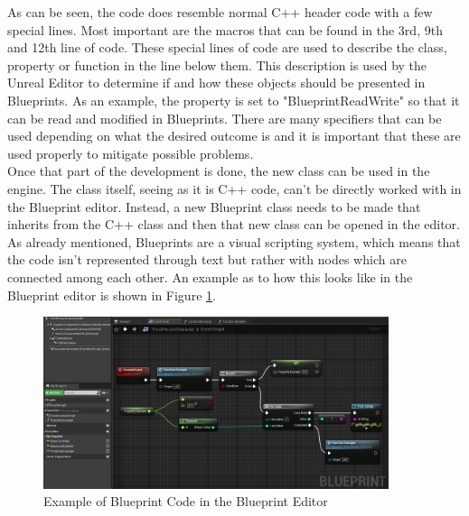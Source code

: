 As can be seen, the code does resemble normal C++ header code with a few special lines. Most important are the macros that can be found in the 3rd, 9th and 12th line of code. These special lines of code are used to describe the class, property or function in the line below them. This description is used by the Unreal Editor to determine if and how these objects should be presented in Blueprints. As an example, the property is set to "BlueprintReadWrite" so that it can be read and modified in Blueprints. There are many specifiers that can be used depending on what the desired outcome is and it is important that these are used properly to mitigate possible problems.\\
 
Once that part of the development is done, the new class can be used in the engine. The class itself, seeing as it is C++ code, can't be directly worked with in the Blueprint editor. Instead, a new Blueprint class needs to be made that inherits from the C++ class and then that new class can be opened in the editor.\\
As already mentioned, Blueprints are a visual scripting system, which means that the code isn't represented through text but rather with nodes which are connected among each other. An example as to how this looks like in the Blueprint editor is shown in Figure \ref{fig:BlueprintExample}.

\begin{figure}[htpb]
	\centering
	\includegraphics[width=0.9\textwidth]{fig/BlueprintExample.png}
	\caption[Example Blueprint Code]{Example of Blueprint Code in the Blueprint Editor\protect}
	\label{fig:BlueprintExample}
\end{figure}

